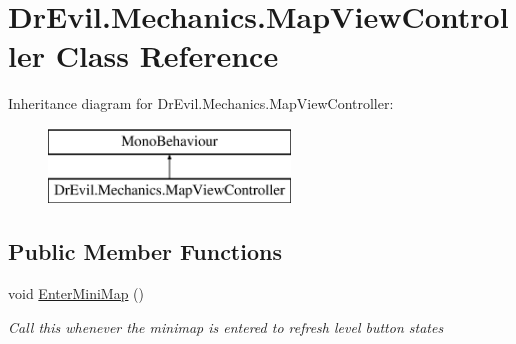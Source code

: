 \hypertarget{class_dr_evil_1_1_mechanics_1_1_map_view_controller}{}\section{Dr\+Evil.\+Mechanics.\+Map\+View\+Controller Class Reference}
\label{class_dr_evil_1_1_mechanics_1_1_map_view_controller}
Inheritance diagram for Dr\+Evil.\+Mechanics.\+Map\+View\+Controller\+:\begin{figure}[H]
\begin{center}
\leavevmode
\includegraphics[height=2.000000cm]{class_dr_evil_1_1_mechanics_1_1_map_view_controller}
\end{center}
\end{figure}
\subsection*{Public Member Functions}
\begin{DoxyCompactItemize}
\item 
void \mbox{\hyperlink{class_dr_evil_1_1_mechanics_1_1_map_view_controller_a1a62e396bd481e7d1b88accd03fc32f5}{Enter\+Mini\+Map}} ()
\begin{DoxyCompactList}\small\item\em Call this whenever the minimap is entered to refresh level button states \end{DoxyCompactList}\end{DoxyCompactItemize}
